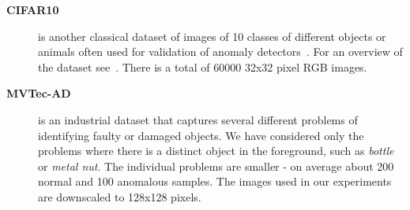 \begin{description}
    \item[\textbf{CIFAR10}] is another classical dataset of images of 10 classes of different objects or animals often used for validation of anomaly detectors~\cite{ruff2018deep, ruff2019deep, chalapathy2018anomaly}. For an overview of the dataset see~\cite{krizhevsky2009learning}. There is a total of 60000 32x32 pixel RGB images.

    \item[\textbf{MVTec-AD}] is an industrial dataset\cite{bergmann2019mvtec} that captures several different problems of identifying faulty or damaged objects. We have considered only the problems where there is a distinct object in the foreground, such as \textit{bottle} or \textit{metal nut}. The individual problems are smaller - on average about 200 normal and 100 anomalous samples. The images used in our experiments are downscaled to 128x128 pixels.
    
\end{description}

